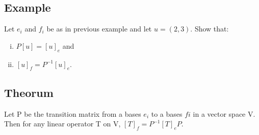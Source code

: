 \documentclass{book}
\begin{document}
\subsection{Example}

Let \({e_i}\) and \({f_i}\) be as in previous example and let \(u = (2, 3)\). Show that:

\begin{enumerate}[(i)]
	\item \(P[u] = [u]_e\) and
	\item \([u]_f = P^{-1}[u]_e\).
\end{enumerate}

\subsection{Theorum}

Let P be the transition matrix from a bases \({e_i}\) to a bases \({fi}\) in a vector space V. Then for any linear operator T on V, \([T]_f = P^{-1}[T]_eP\).
\end{document}
